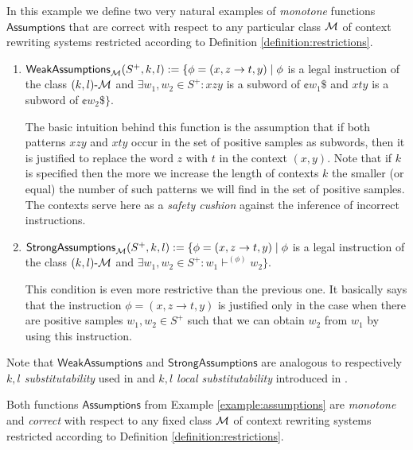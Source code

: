 \begin{example}\label{example:assumptions}
In this example we define two very natural examples of \emph{monotone} functions $\mathsf{Assumptions}$ that are correct with respect to any particular class $\textup{\sf $\mathcal{M}$}$ of context rewriting systems restricted according to Definition \ref{definition:restrictions}.

\begin{enumerate}
\item $\mathsf{WeakAssumptions}_{\textup{\sf $\mathcal{M}$}}(S^+, k, l) := \{ \phi = (x, z \to t, y) \mid \phi $ is a legal instruction of the class $\textup{\sf $(k,l)$-\textup{\sf $\mathcal{M}$}}$ and $\exists w_1, w_2 \in S^+: xzy$ is a subword of $\cent w_1 \$$ and $xty$ is a subword of $\cent w_2 \$ \}$.

The basic intuition behind this function is the assumption that if both patterns $xzy$ and $xty$ occur in the set of positive samples as subwords, then it is justified to replace the word $z$ with $t$ in the context $(x, y)$. Note that if $k$ is specified then the more we increase the length of contexts $k$ the smaller (or equal) the number of such patterns we will find in the set of positive samples. The contexts serve here as a \emph{safety cushion} against the inference of incorrect instructions.

\item $\mathsf{StrongAssumptions}_{\textup{\sf $\mathcal{M}$}}(S^+, k, l) := \{ \phi = (x, z \to t, y) \mid
\phi $ is a legal instruction of the class $\textup{\sf $(k,l)$-\textup{\sf $\mathcal{M}$}}$ and
$\exists w_1, w_2 \in S^+: w_1 \vdash^{(\phi)} w_2\}$.

This condition is even more restrictive than the previous one.
It basically says that the instruction $\phi = (x, z \to t, y)$ is justified only in the
case when there are positive samples $w_1, w_2 \in S^+$ such that we can obtain $w_2$
from $w_1$ by using this instruction.
\end{enumerate}
\end{example}
Note that $\mathsf{WeakAssumptions}$ and $\mathsf{StrongAssumptions}$ are analogous to respectively \emph{$k, l$ substitutability} used in \cite{Yoshinaka2008} and \emph{$k, l$ local substitutability} introduced in \cite{Coste2012}.

\begin{lemma}
Both functions $\mathsf{Assumptions}$ from Example \ref{example:assumptions} are \emph{monotone} and \emph{correct} with respect to any fixed class $\textup{\sf $\mathcal{M}$}$ of context rewriting systems restricted according to Definition \ref{definition:restrictions}.
\end{lemma}

